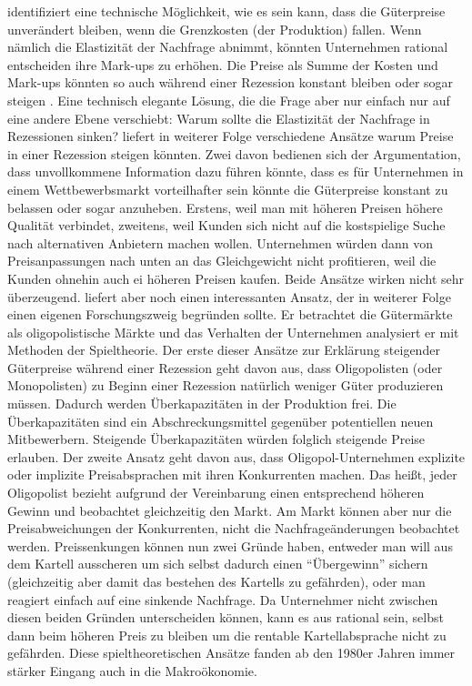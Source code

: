 \textcite{Stiglitz1984} identifiziert eine technische Möglichkeit, wie es sein kann, dass die Güterpreise unverändert bleiben, wenn die Grenzkosten (der Produktion) fallen. Wenn nämlich die Elastizität der Nachfrage abnimmt, könnten Unternehmen rational entscheiden ihre Mark-ups zu erhöhen. Die Preise als Summe der Kosten und Mark-ups könnten so auch während einer Rezession konstant bleiben oder sogar steigen \parencite[S. 351]{Stiglitz1984}. Eine technisch elegante Lösung, die die Frage aber nur einfach nur auf eine andere Ebene verschiebt: Warum sollte die Elastizität der Nachfrage in Rezessionen sinken?
\textcite{Stiglitz1984} liefert in weiterer Folge verschiedene Ansätze warum Preise in einer Rezession steigen könnten. Zwei davon bedienen sich der Argumentation, dass unvollkommene Information dazu führen könnte, dass es für Unternehmen in einem Wettbewerbsmarkt vorteilhafter sein könnte die Güterpreise konstant zu belassen oder sogar anzuheben. Erstens, weil man mit höheren Preisen höhere Qualität verbindet, zweitens, weil Kunden sich nicht auf die kostspielige Suche nach alternativen Anbietern machen wollen. Unternehmen würden dann von Preisanpassungen nach unten an das Gleichgewicht nicht profitieren, weil die Kunden ohnehin auch ei höheren Preisen kaufen. Beide Ansätze wirken nicht sehr überzeugend.
\textcite{Stiglitz1984} liefert aber noch einen interessanten Ansatz, der in weiterer Folge einen eigenen Forschungszweig begründen sollte. Er betrachtet die Gütermärkte als oligopolistische Märkte und das Verhalten der Unternehmen analysiert er mit Methoden der Spieltheorie. Der erste dieser Ansätze zur Erklärung steigender Güterpreise während einer Rezession geht davon aus, dass Oligopolisten (oder Monopolisten) zu Beginn einer Rezession natürlich weniger Güter produzieren müssen. Dadurch werden Überkapazitäten in der Produktion frei. Die Überkapazitäten sind ein Abschreckungsmittel gegenüber potentiellen neuen Mitbewerbern. Steigende Überkapazitäten würden folglich steigende Preise erlauben. Der zweite Ansatz geht davon aus, dass Oligopol-Unternehmen explizite oder implizite Preisabsprachen mit ihren Konkurrenten machen. Das heißt, jeder Oligopolist bezieht aufgrund der Vereinbarung einen entsprechend höheren Gewinn und beobachtet gleichzeitig den Markt. Am Markt können aber nur die Preisabweichungen der Konkurrenten, nicht die Nachfrageänderungen beobachtet werden. Preissenkungen können nun zwei Gründe haben, entweder man will aus dem Kartell ausscheren um sich selbst dadurch einen "`Übergewinn"' sichern (gleichzeitig aber damit das bestehen des Kartells zu gefährden), oder man reagiert einfach auf eine sinkende Nachfrage. Da Unternehmer nicht zwischen diesen beiden Gründen unterscheiden können, kann es aus rational sein, selbst dann beim höheren Preis zu bleiben um die rentable Kartellabsprache nicht zu gefährden. Diese spieltheoretischen Ansätze fanden ab den 1980er Jahren immer stärker Eingang auch in die Makroökonomie. 
